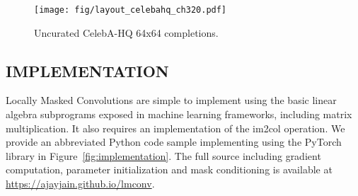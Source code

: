 \documentclass[letterpaper]{article}
\begin{document}
\begin{figure}[t!]
	\centering
	\texttt{[image: fig/layout\_celebahq\_ch320.pdf]}
	\vspace{-6mm}
	\caption{Uncurated CelebA-HQ 64x64 completions.}
	\label{fig:celebahq_inpainting_extra}
\end{figure}

\subsection{IMPLEMENTATION}

Locally Masked Convolutions are simple to implement using the basic linear algebra subprograms exposed in machine learning frameworks, including matrix multiplication. It also requires an implementation of the im2col operation. We provide an abbreviated Python code sample implementing \ours{} using the PyTorch library in Figure~\ref{fig:implementation}. The full source including gradient computation, parameter initialization and mask conditioning is available at
\href{https://ajayjain.github.io/lmconv}{https://ajayjain.github.io/lmconv}.
\end{document}
